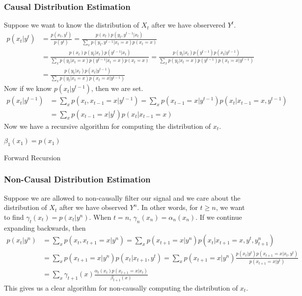 \subsubsection{Causal Distribution Estimation}
Suppose we want to know the distribution of $X_t$ after we have observered $Y^t$.
\begin{align*}
	p(x_t|y^t) &= \frac{p(x_t,y^t)}{p(y^t)} = \frac{p(x_t)p(y_t, y^{t-1}|x_t)}{\sum_{x}p(y_t,y^{t-1}|x_t=x)p(x_t=x)}\\
	&= \frac{p(x_t)p(y_t|x_t)p(y^{t-1}|x_t)}{\sum_xp(y_t|x_t=x)p(y^{t-1}|x_t=x)p(x_t=x)} = \frac{p(y_t|x_t)p(y^{t-1})p(x_t|y^{t-1})}{\sum_{x}p(y_t|x_t=x)p(y^{t-1})p(x_t=x|y^{t-1})}\\
	&=\frac{p(y_t|x_t)p(x_t|y^{t-1})}{\sum_{x}p(y_t|x_t=x)p(x_t=x|y^{t-1})}
\end{align*}
Now if we know $p(x_t|y^{t-1})$, then we are set.
\begin{align*}
	p(x_t|y^{t-1}) &= \sum_xp(x_t,x_{t-1}=x|y^{t-1}) = \sum_x p(x_{t-1}=x|y^{t-1})p(x_t|x_{t-1}=x,y^{t-1}) \\
	&= \sum_x p(x_{t-1}=x|y^t)p(x_t|x_{t-1}=x)
\end{align*}
Now we have a recursive algorithm for computing the distribution of $x_t$.

\begin{algorithm}[H]
	\SetAlgoLined
	$\beta_1(x_1) = p(x_1)$\;
	\caption{Forward Recursion}
\end{algorithm}
\subsubsection{Non-Causal Distribution Estimation}
Suppose we are allowed to non-causally filter our signal and we care about the distribution of $X_t$ after we have observed $Y^n$.
In other words, for $t \geq n$, we want to find $\gamma_t(x_t) = p(x_t|y^n)$.
When $t=n$, $\gamma_n(x_n) = \alpha_n(x_n)$.
If we continue expanding backwards, then
\begin{align*}
	p(x_t|y^n) &= \sum_x p(x_t,x_{t+1}=x|y^n) = \sum_x p(x_{t+1}=x|y^n)p(x_t|x_{t+1}=x,y^t,y_{t+1}^n)\\
	&= \sum_x p(x_{t+1}=x|y^n)p(x_t|x_{t+1},y^t) = \sum_x p(x_{t+1}=x|y^n)\frac{p(x_t|y^t)p(x_{t+1}=x|x_t,y^t)}{p(x_{t+1}=x|y^t)}\\
	&= \sum_x \gamma_{t+1}(x)\frac{\alpha_t(x_t)p(x_{t+1}=x|x_t)}{\beta_{t+1}(x)}
\end{align*}
This gives us a clear algorithm for non-causally computing the distribution of $x_t$.

